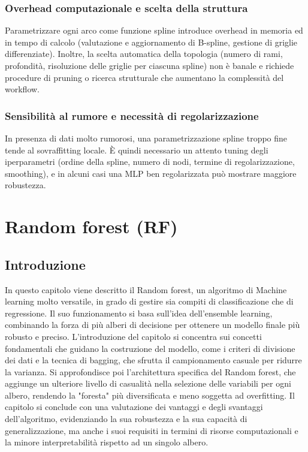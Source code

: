 \documentclass[a4paper,12pt]{report}
\begin{document}
	\subsection{Overhead computazionale e scelta della struttura}
	Parametrizzare ogni arco come funzione spline introduce overhead in memoria ed in tempo di calcolo (valutazione e aggiornamento di B-spline, gestione di griglie differenziate). Inoltre, la scelta automatica della topologia (numero di rami, profondità, risoluzione delle griglie per ciascuna spline) non è banale e richiede procedure di pruning o ricerca strutturale che aumentano la complessità del workflow.
	
	\subsection{Sensibilità al rumore e necessità di regolarizzazione}
	In presenza di dati molto rumorosi, una parametrizzazione spline troppo fine tende al sovraffitting locale. È quindi necessario un attento tuning degli iperparametri (ordine della spline, numero di nodi, termine di regolarizzazione, smoothing), e in alcuni casi una MLP ben regolarizzata può mostrare maggiore robustezza.
	
	\chapter{Random forest (RF)}
	
	\section{Introduzione}
	In questo capitolo viene descritto il Random forest, un algoritmo di Machine learning molto versatile, in grado di gestire sia compiti di classificazione che di regressione. Il suo funzionamento si basa sull'idea dell'ensemble learning, combinando la forza di più alberi di decisione per ottenere un modello finale più robusto e preciso. L'introduzione del capitolo si concentra sui concetti fondamentali che guidano la costruzione del modello, come i criteri di divisione dei dati e la tecnica di bagging, che sfrutta il campionamento casuale per ridurre la varianza. Si approfondisce poi l'architettura specifica del Random forest, che aggiunge un ulteriore livello di casualità nella selezione delle variabili per ogni albero, rendendo la "foresta" più diversificata e meno soggetta ad overfitting. Il capitolo si conclude con una valutazione dei vantaggi e degli svantaggi dell'algoritmo, evidenziando la sua robustezza e la sua capacità di generalizzazione, ma anche i suoi requisiti in termini di risorse computazionali e la minore interpretabilità rispetto ad un singolo albero. \cite{breiman2001randomforest, quinlan1993c45, breiman1996bagging, fatima2023xgbvsrf}
	
\end{document}
